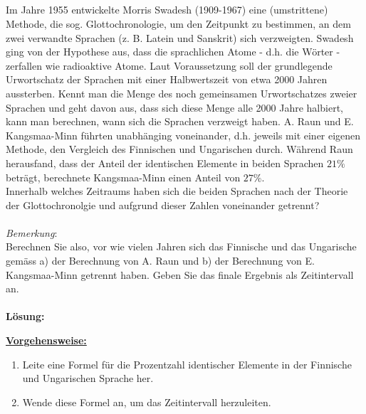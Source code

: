 \subsection*{}
Im Jahre 1955 entwickelte Morris Swadesh (1909-1967) eine (umstrittene) Methode, die sog.
Glottochronologie, um den Zeitpunkt zu bestimmen, an dem zwei verwandte Sprachen (z. B.
Latein und Sanskrit) sich verzweigten. Swadesh ging von der Hypothese aus, dass die sprachlichen
Atome - d.h. die Wörter - zerfallen wie radioaktive Atome. Laut Voraussetzung soll der
grundlegende Urwortschatz der Sprachen mit einer Halbwertszeit von etwa 2000 Jahren aussterben.
Kennt man die Menge des noch gemeinsamen Urwortschatzes zweier Sprachen und geht
davon aus, dass sich diese Menge alle 2000 Jahre halbiert, kann man berechnen, wann sich
die Sprachen verzweigt haben. A. Raun und E. Kangsmaa-Minn führten unabhänging voneinander,
d.h. jeweils mit einer eigenen Methode, den Vergleich des Finnischen und Ungarischen
durch. Während Raun herausfand, dass der Anteil der identischen Elemente in beiden Sprachen
$21 \% $ beträgt, berechnete Kangsmaa-Minn einen Anteil von $ 27 \% $.\\
Innerhalb welches Zeitraums haben sich die beiden Sprachen nach der Theorie der Glottochronolgie
und aufgrund dieser Zahlen voneinander getrennt?\\
\\
\textit{Bemerkung}:\\
Berechnen Sie also, vor wie vielen Jahren sich das Finnische und das Ungarische gemäss a)
der Berechnung von A. Raun und b) der Berechnung von E. Kangsmaa-Minn getrennt haben.
Geben Sie das finale Ergebnis als Zeitintervall an.\\
\\
\textbf{Lösung:}
\begin{mdframed}
\underline{\textbf{Vorgehensweise:}}
\begin{enumerate}
\item Leite eine Formel für die Prozentzahl identischer Elemente in der Finnische und Ungarischen Sprache her.
\item Wende diese Formel an, um das Zeitintervall herzuleiten.
\end{enumerate}
\end{mdframed}

